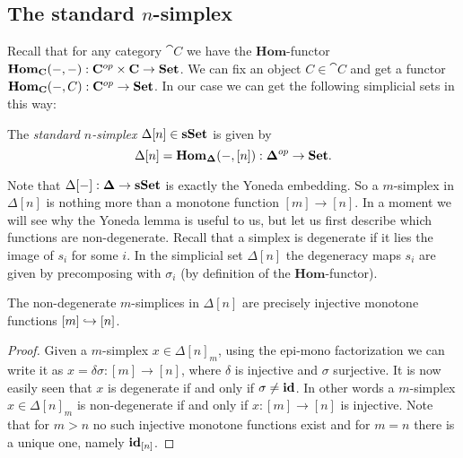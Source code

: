 \subsection{The standard $n$-simplex}
Recall that for any category $\cat{C}$ we have the $\mathbf{Hom}$-functor $\mathbf{Hom}_{\mathbf{C}}(-, -): \mathbf{C}^{op} \times \mathbf{C} \to \mathbf{Set}$. We can fix an object $C \in \cat{C}$ and get a functor $\mathbf{Hom}_{\mathbf{C}}(-, C) : \mathbf{C}^{op} \to \mathbf{Set}$. In our case we can get the following simplicial sets in this way:

\begin{definition}
	The \emph{standard $n$-simplex} $\Delta[n] \in \mathbf{sSet}$ is given by
	$$\Delta[n] = \mathbf{Hom}_{\mathbf{\Delta}}(-, [n]) : \mathbf{\Delta}^{op} \to \mathbf{Set}.$$
\end{definition}

Note that $\Delta[-]: \mathbf{\Delta} \to \mathbf{sSet}$ is exactly the Yoneda embedding. So a $m$-simplex in $\Delta[n]$ is nothing more than a monotone function $[m] \to [n]$. In a moment we will see why the Yoneda lemma is useful to us, but let us first describe which functions are non-degenerate. Recall that a simplex is degenerate if it lies the image of $s_i$ for some $i$. In the simplicial set $\Delta[n]$ the degeneracy maps $s_i$ are given by precomposing with $\sigma_i$ (by definition of the $\mathbf{Hom}$-functor).

\begin{lemma}
	\label{le:standard_nondeg}
	The non-degenerate $m$-simplices in $\Delta[n]$ are precisely injective monotone functions $[m] \hookrightarrow [n]$.
\end{lemma}
\begin{proof}
	Given a $m$-simplex $x \in \Delta[n]_m$, using the epi-mono factorization we can write it as $x = \delta\sigma: [m] \to [n]$, where $\delta$ is injective and $\sigma$ surjective. It is now easily seen that $x$ is degenerate if and only if $\sigma \neq \mathbf{id}$. In other words a $m$-simplex $x \in \Delta[n]_m$ is non-degenerate if and only if $x: [m] \to [n]$ is injective. Note that for $m>n$ no such injective monotone functions exist and for $m=n$ there is a unique one, namely $\mathbf{id}_{[n]}$.
\end{proof}

